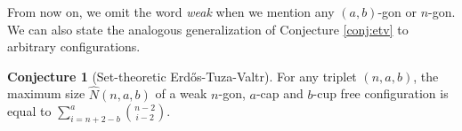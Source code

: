 \documentclass{amsart}
\theoremstyle{definition}
\newtheorem{theorem}[thm]{Theorem}
\newtheorem{conjecture}{Conjecture}
\numberwithin{thm}{section}
\begin{document}
From now on, we omit the word \emph{weak} when we mention any $(a, b)$-gon or $n$-gon.
We can also state the analogous generalization of Conjecture \ref{conj:etv} to arbitrary configurations. 
\begin{conjecture}[Set-theoretic Erd\H{o}s-Tuza-Valtr]
\label{conj:main-conj}
For any triplet $(n, a, b)$, the maximum size $\widehat{N}(n, a, b)$ of a weak $n$-gon, $a$-cap and $b$-cup free configuration is equal to $\sum_{i = n + 2 - b}^{a} \binom{n - 2}{i - 2}$.
\end{conjecture}

\end{document}
